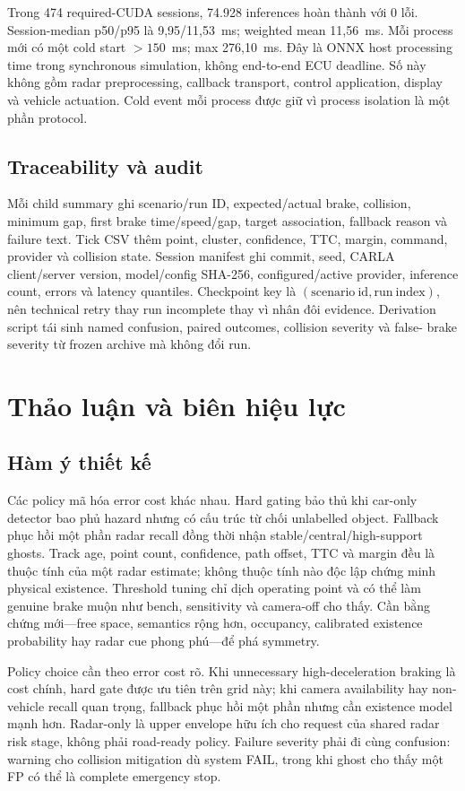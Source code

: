 \documentclass[conference]{IEEEtran}
\begin{document}
Trong 474 required-CUDA sessions, 74.928 inferences hoàn thành với 0 lỗi.
Session-median p50/p95 là 9,95/11,53~ms; weighted mean 11,56~ms. Mỗi process mới
có một cold start $>150$~ms; max 276,10~ms. Đây là ONNX host processing time
trong synchronous simulation, không end-to-end ECU deadline. Số này không gồm
radar preprocessing, callback transport, control application, display và vehicle
actuation. Cold event mỗi process được giữ vì process isolation là một phần
protocol.

\subsection{Traceability và audit}
Mỗi child summary ghi scenario/run ID, expected/actual brake, collision, minimum
gap, first brake time/speed/gap, target association, fallback reason và failure
text. Tick CSV thêm point, cluster, confidence, TTC, margin, command, provider và
collision state. Session manifest ghi commit, seed, CARLA client/server version,
model/config SHA-256, configured/active provider, inference count, errors và
latency quantiles. Checkpoint key là $(\mathrm{scenario\ id},\mathrm{run\ index})$,
nên technical retry thay run incomplete thay vì nhân đôi evidence. Derivation
script tái sinh named confusion, paired outcomes, collision severity và false-
brake severity từ frozen archive mà không đổi run.

\section{Thảo luận và biên hiệu lực}
\subsection{Hàm ý thiết kế}
Các policy mã hóa error cost khác nhau. Hard gating bảo thủ khi car-only detector
bao phủ hazard nhưng có cấu trúc từ chối unlabelled object. Fallback phục hồi một
phần radar recall đồng thời nhận stable/central/high-support ghosts. Track age,
point count, confidence, path offset, TTC và margin đều là thuộc tính của một
radar estimate; không thuộc tính nào độc lập chứng minh physical existence.
Threshold tuning chỉ dịch operating point và có thể làm genuine brake muộn như
bench, sensitivity và camera-off cho thấy. Cần bằng chứng mới---free space,
semantics rộng hơn, occupancy, calibrated existence probability hay radar cue
phong phú---để phá symmetry.

Policy choice cần theo error cost rõ. Khi unnecessary high-deceleration braking
là cost chính, hard gate được ưu tiên trên grid này; khi camera availability hay
non-vehicle recall quan trọng, fallback phục hồi một phần nhưng cần existence
model mạnh hơn. Radar-only là upper envelope hữu ích cho request của shared radar
risk stage, không phải road-ready policy. Failure severity phải đi cùng confusion:
warning cho collision mitigation dù system FAIL, trong khi ghost cho thấy một FP
có thể là complete emergency stop.
\end{document}
